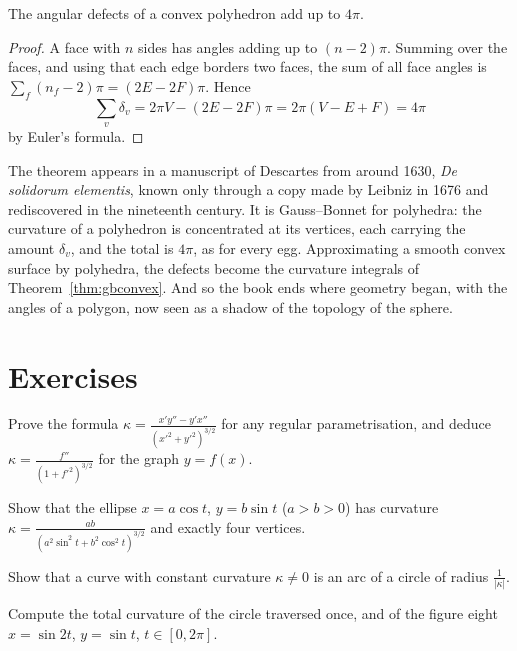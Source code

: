 \begin{theorem}[Descartes]\label{thm:descartesdefect}
The angular defects of a convex polyhedron add up to $4\pi$.
\end{theorem}

\begin{proof}
A face with $n$ sides has angles adding up to $(n-2)\pi$. Summing over the faces, and using that each edge borders two faces, the sum of all face angles is
$\sum_f(n_f-2)\pi=(2E-2F)\pi$. Hence
\[
\sum_v\delta_v=2\pi V-(2E-2F)\pi=2\pi(V-E+F)=4\pi
\]
by Euler's formula.
\end{proof}

The theorem appears in a manuscript of Descartes from around 1630, \emph{De solidorum elementis}, known only through a copy made by Leibniz in 1676 and rediscovered
in the nineteenth century. It is Gauss--Bonnet for polyhedra: the curvature of a polyhedron is concentrated at its vertices, each carrying the amount $\delta_v$,
and the total is $4\pi$, as for every egg. Approximating a smooth convex surface by polyhedra, the defects become the curvature integrals of
Theorem~\ref{thm:gbconvex}. And so the book ends where geometry began, with the angles of a polygon, now seen as a shadow of the topology of the sphere.

\section{Exercises}

\begin{exercise}[$\star$]\label{ex:graphcurv}
Prove the formula $\kappa=\frac{x'y''-y'x''}{(x'^2+y'^2)^{3/2}}$ for any regular parametrisation, and deduce $\kappa=\frac{f''}{(1+f'^2)^{3/2}}$ for the graph $y=f(x)$.
\end{exercise}

\begin{exercise}[$\star$]\label{ex:ellipsevertex}
Show that the ellipse $x=a\cos t$, $y=b\sin t$ ($a>b>0$) has curvature $\kappa=\frac{ab}{(a^2\sin^2t+b^2\cos^2t)^{3/2}}$ and exactly four vertices.
\end{exercise}

\begin{exercise}[$\star$]\label{ex:constcurv}
Show that a curve with constant curvature $\kappa\ne0$ is an arc of a circle of radius $\frac1{|\kappa|}$.
\end{exercise}

\begin{exercise}[$\star$]\label{ex:totalcurv}
Compute the total curvature of the circle traversed once, and of the figure eight $x=\sin2t$, $y=\sin t$, $t\in[0,2\pi]$.
\end{exercise}


